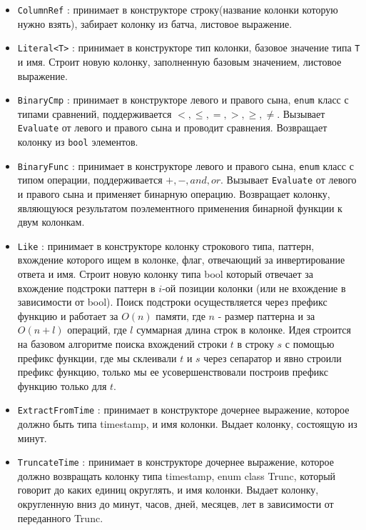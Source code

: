 \documentclass[a4paper,12pt]{extarticle}
\begin{document}
\begin{itemize}
    \item \texttt{ColumnRef} : принимает в конструкторе строку(название колонки которую нужно взять),
    забирает колонку из батча, листовое выражение.
    \item \texttt{Literal<T>} : принимает в конструкторе тип колонки, базовое значение
    типа \texttt{T} и имя. Строит новую колонку, заполненную базовым значением,
     листовое выражение.
    \item \texttt{BinaryCmp} : принимает в конструкторе левого и правого сына,
    \texttt{enum} класс с типами сравнений, поддерживается $<, \leq, =, >, \geq, \neq$.
    Вызывает \texttt{Evaluate} от левого и правого сына и проводит сравнения.
    Возвращает колонку из \texttt{bool} элементов.
    \item \texttt{BinaryFunc} : принимает в конструкторе левого и правого сына,
    \texttt{enum} класс с типом операции, поддерживается $+, -, and, or$.
    Вызывает \texttt{Evaluate} от левого и правого сына и применяет бинарную операцию.
    Возвращает колонку, являющуюся результатом поэлементного применения бинарной функции к двум колонкам.
    \item \texttt{Like} : принимает в конструкторе колонку строкового типа,
    паттерн, вхождение которого ищем в колонке, флаг, отвечающий за инвертирование 
    ответа и имя. Строит новую колонку типа bool который отвечает за вхождение
    подстроки паттерн в $i$-ой позиции колонки (или не вхождение в зависимости от bool).
    Поиск подстроки осуществляется через префикс функцию и работает за $O(n)$ памяти,
    где $n$ - размер паттерна и за $O(n + l)$ операций,
     где $l$ суммарная длина строк в колонке.
    Идея строится на базовом алгоритме поиска вхождений строки $t$ в строку $s$ с
    помощью префикс функции, где мы склеивали $t$ и $s$ через сепаратор и явно строили
    префикс функцию,
     только мы ее усовершенствовали построив префикс функцию 
    только для $t$.
    \item \texttt{ExtractFromTime} :
    принимает в конструкторе дочернее выражение, которое должно быть
    типа timestamp, и имя колонки. Выдает колонку, состоящую из минут.
    \item \texttt{TruncateTime} :
    принимает в конструкторе дочернее выражение, которое должно возвращать
    колонку типа timestamp, enum class Trunc, который
    говорит до каких единиц округлять, и имя колонки.
    Выдает колонку, округленную вниз до минут, часов, дней, месяцев, лет в зависимости
    от переданного Trunc.
\end{itemize}
\end{document}
